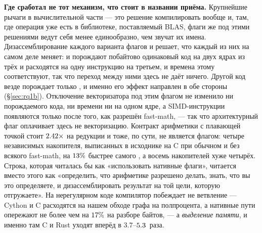 \textbf{Где сработал не тот механизм, что стоит в названии приёма.} Крупнейшие рычаги в вычислительной части
--- это решение компилировать вообще и, там, где операция уже есть в библиотеке, поставляемый BLAS,
флаги же под этими решениями ведут себя менее единообразно, чем звучат их имена.
Дизассемблирование каждого варианта флагов и решает, что каждый из них на самом деле меняет:
 и  порождают побайтово одинаковый код на двух ядрах из трёх и расходятся на
одну инструкцию на третьем, и времена этому соответствуют, так что переход между ними здесь не
даёт ничего. Другой код везде порождает только , и именно его эффект
направлен в обе стороны (\S\ref{sec:rq1b}). Отключение векторизатора под этим флагом не
изменило ни порождаемого кода, ни времени ни на одном ядре, а SIMD-инструкции появляются только
после того, как разрешён fast-math, --- так что архитектурный флаг оплачивает здесь не векторизацию.
Контракт арифметики с плавающей точкой стоит $\meas{ratio:b1_flags-314:arraysum/O3native|b1_flags-314:arraysum/O3native_ffast}{2.42}\times$ на редукции и тоже, по сути, не является
флагом: четыре независимых накопителя, выписанных в исходнике на C при обычном  и без
всякого fast-math, на $\meas{pct:b1_flags-314:arraysum/O3native_ffast|b1_flags-314:arraysum/accum_acc4}{13}\%$ быстрее самого , а восемь накопителей хуже
четырёх. Строка, которая читалась бы как «использовать нативные флаги», читается вместо этого как
«определить, что арифметике разрешено делать, знать, что вы это определяете, и дизассемблировать
результат на той цели, которую отгружаете». На нерегулярном коде компилятор побеждает не ветвление
--- Cython и C расходятся на нашем обходе графа на полпроцента, а нативные пути опережают не более
чем на $\meas{pct:b2_branchy-314:tokenize/codon_jit|b2_branchy-314:tokenize/c_ctypes}{17}\%$ на разборе байтов, --- а \emph{выделение памяти}, и именно там C и Rust уходят вперёд
в $3.7$--$\meas{ratio:b2_branchy-314:binarytrees/numba|b2_branchy-314:binarytrees/rust_ctypes}{5.3}$~раза.

